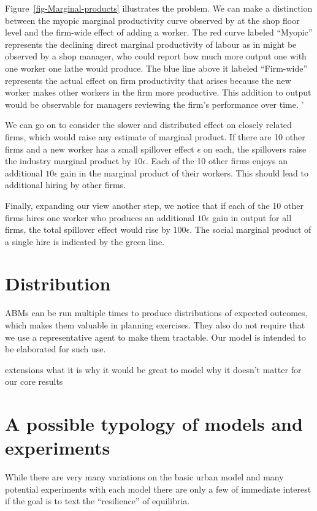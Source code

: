 Figure~\ref{fig-Marginal-products} illustrates the problem. We can  make a distinction between the myopic marginal productivity curve observed by at the shop floor level and  the firm-wide effect of adding a worker. The red curve labeled ``Myopic'' represents the declining direct marginal productivity of labour as in might be observed by a shop manager, who could report how much more output one with one worker one lathe would produce. The blue line above it labeled ``Firm-wide'' represents the actual effect on firm productivity that arises because the new worker makes other workers in the firm more productive. This addition to output would be observable for managers reviewing the firm's performance over time. ' 

We can go on to consider the slower and distributed effect on closely related firms, which would raise any estimate of marginal product.  If there are 10 other firms and a new worker  has a small spillover effect  $\epsilon$ on each,  the spillovers raise the industry  marginal product  by $10\epsilon$. Each of the  10 other firms  enjoys  an additional $10\epsilon$ gain in the marginal product of their workers. This should lead to additional hiring by other firms.

Finally, expanding our view another step, we notice that if each of the  10 other firms hires one worker who produces an additional  $10\epsilon$ gain in output for all firms, the total spillover effect would rise by $100\epsilon$. The social marginal product of a single hire is indicated by the green line. 





\section{Distribution}%
ABMs can be run multiple times to produce distributions of expected outcomes, which makes them valuable in planning exercises. They also do not require that we use a representative agent to make them tractable. Our model is intended to be elaborated  for such use. 

extensions
what it is
why it would be great to model
why it doesn't matter for our core results

\section{A possible typology of models and experiments}
While there  are very many variations on the basic urban model and many potential experiments with each model there are only a few of immediate interest if the goal is to text the ``resilience'' of equilibria.

